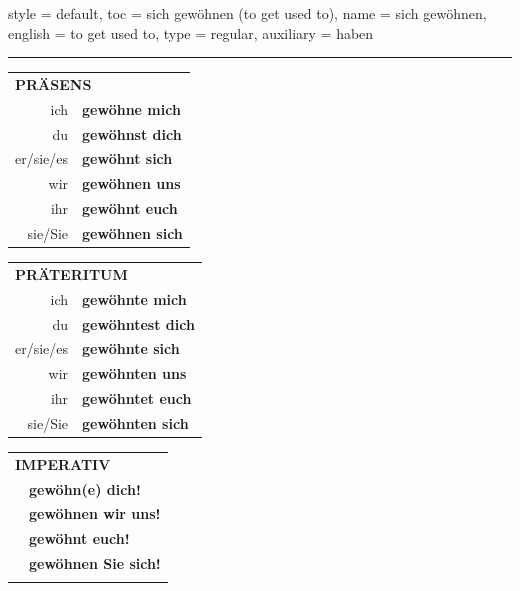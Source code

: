 \begin{verbentry}{
  style = {default},
  toc = {sich gewöhnen (to get used to)},
  name = {sich gewöhnen},
  english = {to get used to},
  type = {regular},
  auxiliary = {haben}
}
 
    
     \vspace{5pt}

    \hrule
    
    \vspace{5pt}

  \begin{tabular}{rl}
     \multicolumn{2}{l}{\textbf{PRÄSENS} }\\
    ich & \textbf{gewöhne mich}\\
    du & \textbf{gewöhnst dich}\\
    er/sie/es & \textbf{gewöhnt sich}\\
    wir & \textbf{gewöhnen uns}\\
    ihr & \textbf{gewöhnt euch}\\
    sie/Sie & \textbf{gewöhnen sich}\\
  \end{tabular}
  \hfill
     \begin{tabular}{rl}
    \multicolumn{2}{l}{\textbf{PRÄTERITUM} }\\
    ich & \textbf{gewöhnte mich}\\
    du & \textbf{gewöhntest dich}\\
    er/sie/es & \textbf{gewöhnte sich}\\
    wir & \textbf{gewöhnten uns}\\
    ihr & \textbf{gewöhntet euch}\\
    sie/Sie & \textbf{gewöhnten sich}\\
  \end{tabular}
  \hfill
  \begin{tabular}{rl}
     \multicolumn{2}{l}{\textbf{IMPERATIV} }\\
   & \textbf{gewöhn(e) dich!}\\
   & \textbf{gewöhnen wir uns!}\\
   & \textbf{gewöhnt euch!}\\
   & \textbf{gewöhnen Sie sich!}\\
   & \vspace{10pt}
  \end{tabular}

    \vspace{10pt}


\end{verbentry}
